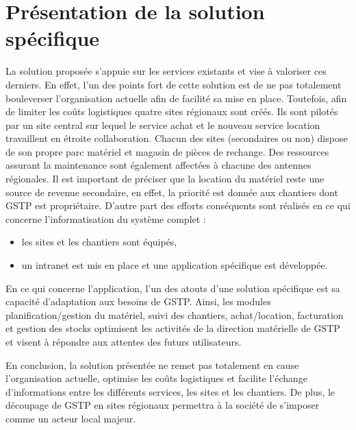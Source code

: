 \section{Présentation de la solution spécifique}
La solution proposée s’appuie sur les services existants et vise à valoriser ces derniers. 
En effet, l’un des points fort de cette solution est de ne pas totalement bouleverser l’organisation actuelle afin de facilité sa mise en place.
Toutefois, afin de limiter les coûts logistiques quatre sites régionaux sont créés. 
Ils sont pilotés par un site central sur lequel le service achat et le nouveau service location travaillent en étroite collaboration. Chacun des sites (secondaires ou non) dispose de son propre parc matériel et magasin de pièces de rechange. Des ressources assurant la maintenance sont également affectées à chacune des antennes régionales. 
Il est important de préciser que la location du matériel reste une source de revenue secondaire, en effet, la priorité est donnée aux chantiers dont GSTP est propriétaire.
D’autre part des efforts conséquents sont réalisés en ce qui concerne l’informatisation du système complet :
    \begin{itemize}
        \item les sites et les chantiers sont équipés,
        \item un intranet est mis en place et une application spécifique est développée.
    \end{itemize}

En ce qui concerne l’application, l’un des atouts d’une solution spécifique est sa capacité d’adaptation aux besoins de GSTP. 
Ainsi, les modules planification/gestion du matériel, suivi des chantiers, achat/location, facturation et gestion des stocks optimisent les activités de la direction matérielle de GSTP et visent à répondre aux attentes des futurs utilisateurs.

En conclusion, la solution présentée ne remet pas totalement en cause l’organisation actuelle, optimise les coûts logistiques et facilite l’échange d’informations entre les différents services, les sites et les chantiers. 
De plus, le découpage de GSTP en sites régionaux permettra à la société de s’imposer comme un acteur local majeur.



